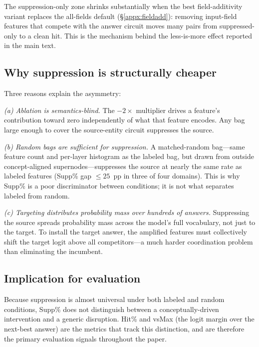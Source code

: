 The suppression-only zone shrinks substantially when the best field-additivity variant replaces the all-fields default (\S\ref{appx:fieldadd}): removing input-field features that compete with the answer circuit moves many pairs from suppressed-only to a clean hit. This is the mechanism behind the less-is-more effect reported in the main text.

\subsection{Why suppression is structurally cheaper}

Three reasons explain the asymmetry:

\emph{(a) Ablation is semantics-blind.} The $-2\times$ multiplier drives a feature's contribution toward zero independently of what that feature encodes. Any bag large enough to cover the source-entity circuit suppresses the source.

\emph{(b) Random bags are sufficient for suppression.} A matched-random bag---same feature count and per-layer histogram as the labeled bag, but drawn from outside concept-aligned supernodes---suppresses the source at nearly the same rate as labeled features (Supp\% gap $\leq 25$~pp in three of four domains). This is why Supp\% is a poor discriminator between conditions; it is not what separates labeled from random.

\emph{(c) Targeting distributes probability mass over hundreds of answers.} Suppressing the source spreads probability mass across the model's full vocabulary, not just to the target. To install the target answer, the amplified features must collectively shift the target logit above all competitors---a much harder coordination problem than eliminating the incumbent.

\subsection{Implication for evaluation}

Because suppression is almost universal under both labeled and random conditions, Supp\% does not distinguish between a conceptually-driven intervention and a generic disruption. Hit\% and vsMax (the logit margin over the next-best answer) are the metrics that track this distinction, and are therefore the primary evaluation signals throughout the paper.


